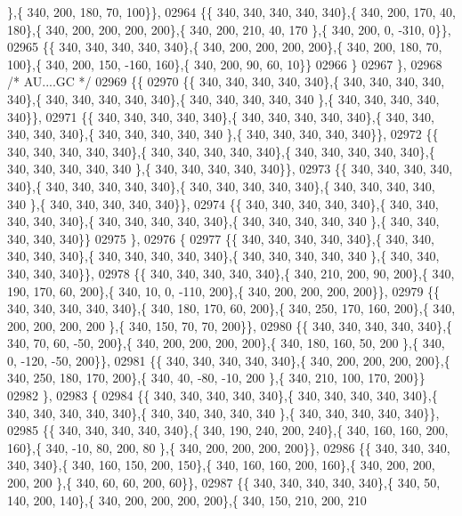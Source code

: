 \begin{DoxyCode}
      \},\{ 340, 200, 180,  70, 100\}\},
02964 \{\{ 340, 340, 340, 340, 340\},\{ 340, 200, 170,  40, 180\},\{ 340, 200, 200, 200, 200\},\{ 340, 200, 210,  40, 170
      \},\{ 340, 200,   0, -310,   0\}\},
02965 \{\{ 340, 340, 340, 340, 340\},\{ 340, 200, 200, 200, 200\},\{ 340, 200, 180,  70, 100\},\{ 340, 200, 150, -160, 
      160\},\{ 340, 200,  90,  60,  10\}\}
02966 \}
02967 \},
02968 \textcolor{comment}{/* AU....GC */}
02969 \{\{
02970 \{\{ 340, 340, 340, 340, 340\},\{ 340, 340, 340, 340, 340\},\{ 340, 340, 340, 340, 340\},\{ 340, 340, 340, 340, 340
      \},\{ 340, 340, 340, 340, 340\}\},
02971 \{\{ 340, 340, 340, 340, 340\},\{ 340, 340, 340, 340, 340\},\{ 340, 340, 340, 340, 340\},\{ 340, 340, 340, 340, 340
      \},\{ 340, 340, 340, 340, 340\}\},
02972 \{\{ 340, 340, 340, 340, 340\},\{ 340, 340, 340, 340, 340\},\{ 340, 340, 340, 340, 340\},\{ 340, 340, 340, 340, 340
      \},\{ 340, 340, 340, 340, 340\}\},
02973 \{\{ 340, 340, 340, 340, 340\},\{ 340, 340, 340, 340, 340\},\{ 340, 340, 340, 340, 340\},\{ 340, 340, 340, 340, 340
      \},\{ 340, 340, 340, 340, 340\}\},
02974 \{\{ 340, 340, 340, 340, 340\},\{ 340, 340, 340, 340, 340\},\{ 340, 340, 340, 340, 340\},\{ 340, 340, 340, 340, 340
      \},\{ 340, 340, 340, 340, 340\}\}
02975 \},
02976 \{
02977 \{\{ 340, 340, 340, 340, 340\},\{ 340, 340, 340, 340, 340\},\{ 340, 340, 340, 340, 340\},\{ 340, 340, 340, 340, 340
      \},\{ 340, 340, 340, 340, 340\}\},
02978 \{\{ 340, 340, 340, 340, 340\},\{ 340, 210, 200,  90, 200\},\{ 340, 190, 170,  60, 200\},\{ 340,  10,   0, -110, 
      200\},\{ 340, 200, 200, 200, 200\}\},
02979 \{\{ 340, 340, 340, 340, 340\},\{ 340, 180, 170,  60, 200\},\{ 340, 250, 170, 160, 200\},\{ 340, 200, 200, 200, 200
      \},\{ 340, 150,  70,  70, 200\}\},
02980 \{\{ 340, 340, 340, 340, 340\},\{ 340,  70,  60, -50, 200\},\{ 340, 200, 200, 200, 200\},\{ 340, 180, 160,  50, 200
      \},\{ 340,   0, -120, -50, 200\}\},
02981 \{\{ 340, 340, 340, 340, 340\},\{ 340, 200, 200, 200, 200\},\{ 340, 250, 180, 170, 200\},\{ 340,  40, -80, -10, 200
      \},\{ 340, 210, 100, 170, 200\}\}
02982 \},
02983 \{
02984 \{\{ 340, 340, 340, 340, 340\},\{ 340, 340, 340, 340, 340\},\{ 340, 340, 340, 340, 340\},\{ 340, 340, 340, 340, 340
      \},\{ 340, 340, 340, 340, 340\}\},
02985 \{\{ 340, 340, 340, 340, 340\},\{ 340, 190, 240, 200, 240\},\{ 340, 160, 160, 200, 160\},\{ 340, -10,  80, 200,  80
      \},\{ 340, 200, 200, 200, 200\}\},
02986 \{\{ 340, 340, 340, 340, 340\},\{ 340, 160, 150, 200, 150\},\{ 340, 160, 160, 200, 160\},\{ 340, 200, 200, 200, 200
      \},\{ 340,  60,  60, 200,  60\}\},
02987 \{\{ 340, 340, 340, 340, 340\},\{ 340,  50, 140, 200, 140\},\{ 340, 200, 200, 200, 200\},\{ 340, 150, 210, 200, 210

\end{DoxyCode}
